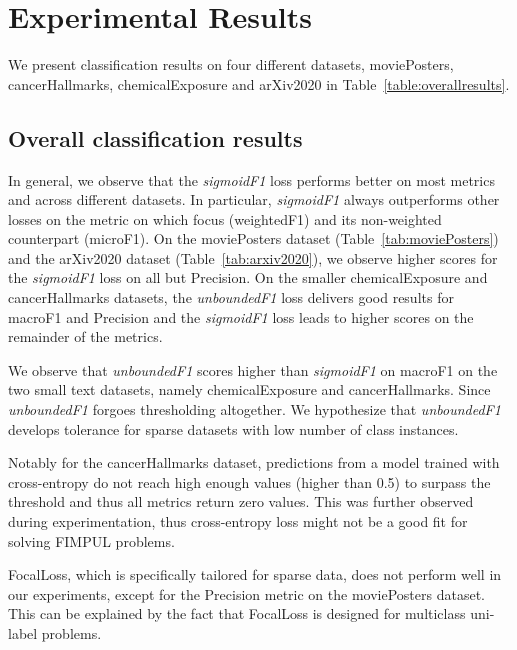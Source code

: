 
\section{Experimental Results}
\label{sec:orgc23a664}

We present classification results on four different datasets, movie\-Posters, cancerHallmarks, chemicalExposure and arXiv2020 in Table~\ref{table:overallresults}.

\subsection{Overall classification results}

In general, we observe that the \emph{sigmoidF1} loss performs better on most metrics and across different datasets. In particular, \emph{sigmoidF1} always outperforms other losses on the metric on which focus (weightedF1) and its non-weighted counterpart (microF1).
On the moviePosters dataset (Table~\ref{tab:moviePosters}) and the arXiv2020 dataset (Table~\ref{tab:arxiv2020}), we observe higher scores for the \emph{sigmoidF1} loss on all but Precision.
On the smaller chemicalExposure and cancerHallmarks datasets, the \emph{unboundedF1} loss delivers good results for macroF1 and Precision and the \emph{sigmoidF1} loss leads to higher scores on the remainder of the metrics.

We observe that \emph{unboundedF1} scores higher than \emph{sigmoidF1} on macroF1 on the two small text datasets, namely chemicalExposure and cancerHallmarks. Since \emph{unboundedF1} forgoes thresholding altogether. We hypothesize that \emph{unboundedF1} develops tolerance for sparse datasets with low number of class instances.

Notably for the cancerHallmarks dataset, predictions from a model trained with cross-entropy do not reach high enough values (higher than 0.5) to surpass the threshold and thus all metrics return zero values. This was further observed during experimentation, thus cross-entropy loss might not be a good fit for solving FIMPUL problems.


FocalLoss, which is specifically tailored for sparse data, does not perform well in our experiments, except for the Precision metric on the moviePosters dataset. This can be explained by the fact that FocalLoss is designed for multiclass uni-label problems.

